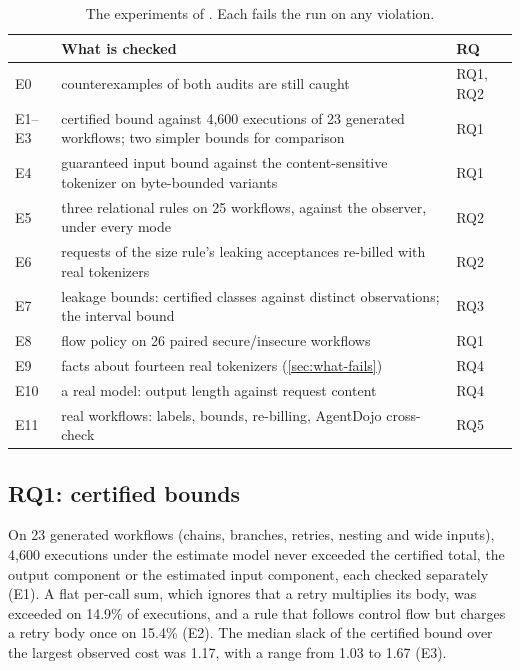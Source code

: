 \begin{table}[t]
\centering
\caption{The experiments of . Each fails the run on any violation.}
\label{tab:experiments}
\small
\begin{tabularx}{\textwidth}{@{}l>{\raggedright\arraybackslash}Xl@{}}
\toprule
& What is checked & RQ \\
\midrule
E0 & counterexamples of both audits are still caught & RQ1, RQ2 \\
E1--E3 & certified bound against 4,600 executions of 23 generated workflows; two simpler bounds for comparison & RQ1 \\
E4 & guaranteed input bound against the content-sensitive tokenizer on byte-bounded variants & RQ1 \\
E5 & three relational rules on 25 workflows, against the observer, under every mode & RQ2 \\
E6 & requests of the size rule's leaking acceptances re-billed with real tokenizers & RQ2 \\
E7 & leakage bounds: certified classes against distinct observations; the interval bound & RQ3 \\
E8 & flow policy on 26 paired secure/insecure workflows & RQ1 \\
E9 & facts about fourteen real tokenizers (\cref{sec:what-fails}) & RQ4 \\
E10 & a real model: output length against request content & RQ4 \\
E11 & 30 real workflows: labels, bounds, re-billing, AgentDojo cross-check & RQ5 \\
\bottomrule
\end{tabularx}
\end{table}

\subsection{RQ1: certified bounds}\label{sec:eval-bounds}

On 23 generated workflows (chains, branches, retries, nesting and wide inputs), 4,600
executions under the estimate model never exceeded the certified total, the output
component or the estimated input component, each checked separately (E1). A flat
per-call sum, which ignores that a retry multiplies its body, was exceeded on 14.9\%
of executions, and a rule that follows control flow but charges a retry body once on
15.4\% (E2). The median slack of the certified bound over the largest observed cost was
1.17, with a range from 1.03 to 1.67 (E3).

